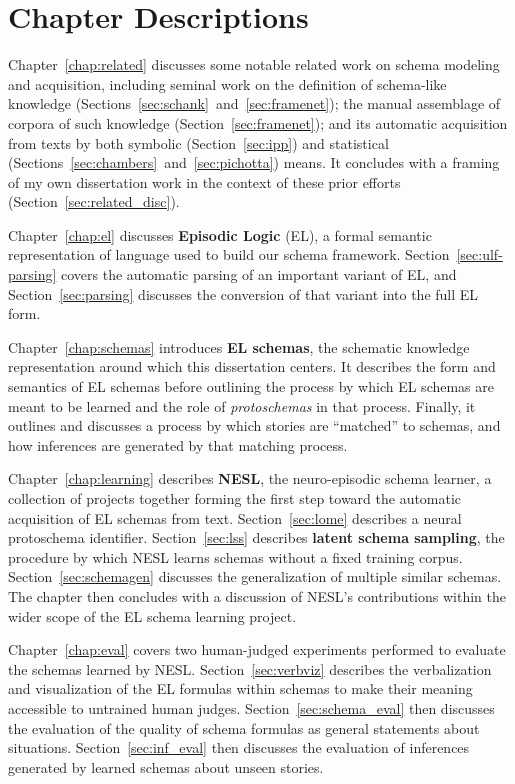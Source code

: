 \section{Chapter Descriptions}
Chapter~\ref{chap:related} discusses some notable related work on schema modeling and acquisition, including seminal work on the definition of schema-like knowledge (Sections~\ref{sec:schank}~and~\ref{sec:framenet}); the manual assemblage of corpora of such knowledge (Section~\ref{sec:framenet}); and its automatic acquisition from texts by both symbolic (Section~\ref{sec:ipp}) and statistical (Sections~\ref{sec:chambers}~and~\ref{sec:pichotta}) means. It concludes with a framing of my own dissertation work in the context of these prior efforts (Section~\ref{sec:related_disc}).

Chapter~\ref{chap:el} discusses \textbf{Episodic Logic} (EL), a formal semantic representation of language used to build our schema framework. Section~\ref{sec:ulf-parsing} covers the automatic parsing of an important variant of EL, and Section~\ref{sec:parsing} discusses the conversion of that variant into the full EL form.

Chapter~\ref{chap:schemas} introduces \textbf{EL schemas}, the schematic knowledge representation around which this dissertation centers. It describes the form and semantics of EL schemas before outlining the process by which EL schemas are meant to be learned and the role of \textit{protoschemas} in that process. Finally, it outlines and discusses a process by which stories are ``matched'' to schemas, and how inferences are generated by that matching process.

Chapter~\ref{chap:learning} describes \textbf{NESL}, the neuro-episodic schema learner, a collection of projects together forming the first step toward the automatic acquisition of EL schemas from text. Section~\ref{sec:lome} describes a neural protoschema identifier. Section~\ref{sec:lss} describes \textbf{latent schema sampling}, the procedure by which NESL learns schemas without a fixed training corpus. Section~\ref{sec:schemagen} discusses the generalization of multiple similar schemas. The chapter then concludes with a discussion of NESL's contributions within the wider scope of the EL schema learning project.

Chapter~\ref{chap:eval} covers two human-judged experiments performed to evaluate the schemas learned by NESL. Section~\ref{sec:verbviz} describes the verbalization and visualization of the EL formulas within schemas to make their meaning accessible to untrained human judges. Section~\ref{sec:schema_eval} then discusses the evaluation of the quality of schema formulas as general statements about situations. Section~\ref{sec:inf_eval} then discusses the evaluation of inferences generated by learned schemas about unseen stories.